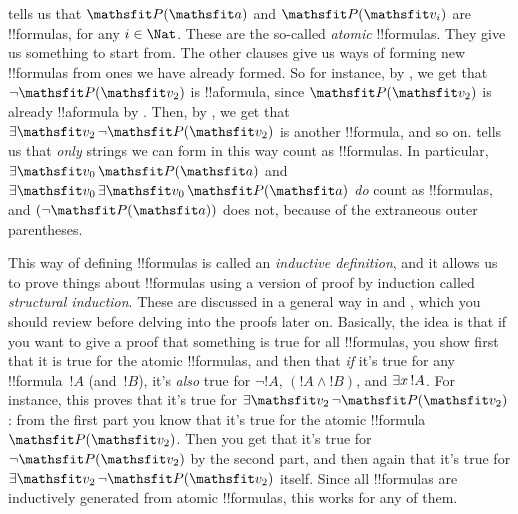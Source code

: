 \documentclass[../../../include/open-logic-section]{subfiles}
\begin{document}
 tells us that $\Atom{\Obj P}{\Obj a}$ and
$\Atom{\Obj P}{\Obj v_i}$ are !!{formula}s, for any $i \in
\Nat$. These are the so-called \emph{atomic} !!{formula}s. They give
us something to start from.  The other clauses give us ways of forming
new !!{formula}s from ones we have already formed. So for instance, by
, we get that $\lnot \Atom{\Obj P}{\Obj v_2}$ is
!!a{formula}, since $\Atom{\Obj P}{\Obj v_2}$ is already !!a{formula}
by . Then, by , we get that
$\lexists[\Obj v_2][\lnot \Atom{\Obj P}{\Obj v_2}]$ is another
!!{formula}, and so on.   tells us that \emph{only}
strings we can form in this way count as !!{formula}s. In particular,
$\lexists[\Obj v_0][\Atom{\Obj P}{\Obj a}]$ and $\lexists[\Obj
  v_0][\lexists[\Obj v_0][\Atom{\Obj P}{\Obj a}]]$ \emph{do} count as
!!{formula}s, and $(\lnot \Atom{\Obj P}{\Obj a})$ does not, because of
the extraneous outer parentheses.

This way of defining !!{formula}s is called an \emph{inductive
definition}, and it allows us to prove things about !!{formula}s using
a version of proof by induction called \emph{structural induction}.
These are discussed in a general way in  and
, which you should review before delving
into the proofs later on. Basically, the idea is that if you want to
give a proof that something is true for all !!{formula}s, you show
first that it is true for the atomic !!{formula}s, and then that
\emph{if} it's true for any !!{formula}~$!A$ (and~$!B$), it's
\emph{also} true for $\lnot !A$, $(!A \land !B)$, and
$\lexists[x][!A]$. For instance, this proves that it's true for
$\lexists[\Obj v_2][\lnot \Atom{\Obj P}{\Obj v_2}]$: from the first
part you know that it's true for the atomic !!{formula}~$\Atom{\Obj
P}{\Obj v_2}$. Then you get that it's true for $\lnot \Atom{\Obj
P}{\Obj v_2}$ by the second part, and then again that it's true for
$\lexists[\Obj v_2][\lnot \Atom{\Obj P}{\Obj v_2}]$ itself. Since all
!!{formula}s are inductively generated from atomic !!{formula}s, this
works for any of them.
\end{document}
